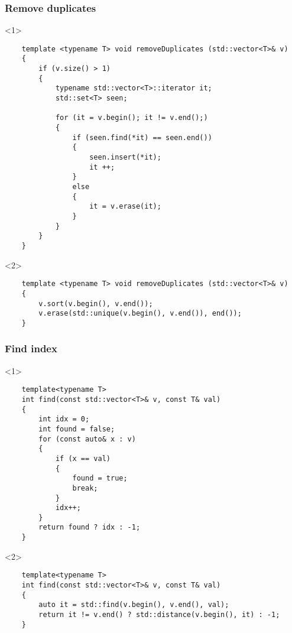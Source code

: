 \documentclass{beamer}
\begin{document}
\begin{frame}[fragile]
\frametitle{Remove duplicates}
    \begin{onlyenv}<1>
    \begin{lstlisting}
    template <typename T> void removeDuplicates (std::vector<T>& v)
    {
        if (v.size() > 1)
        {
            typename std::vector<T>::iterator it;
            std::set<T> seen;

            for (it = v.begin(); it != v.end();)
            {
                if (seen.find(*it) == seen.end())
                {
                    seen.insert(*it);
                    it ++;
                }
                else
                {
                    it = v.erase(it);
                }
            }
        }
    }
    \end{lstlisting}
    \end{onlyenv}
    \begin{onlyenv}<2>
    \begin{lstlisting}
    template <typename T> void removeDuplicates (std::vector<T>& v)
    {
        v.sort(v.begin(), v.end());
        v.erase(std::unique(v.begin(), v.end()), end());
    }
    \end{lstlisting}
    \end{onlyenv}
\end{frame}

\begin{frame}[fragile]
\frametitle{Find index}
    \begin{onlyenv}<1>
    \begin{lstlisting}
    template<typename T>
    int find(const std::vector<T>& v, const T& val)
    {
        int idx = 0;
        int found = false;
        for (const auto& x : v)
        {
            if (x == val)
            {
                found = true;
                break;
            }
            idx++;
        }
        return found ? idx : -1;
    }
    \end{lstlisting}
    \end{onlyenv}
    \begin{onlyenv}<2>
    \begin{lstlisting}
    template<typename T>
    int find(const std::vector<T>& v, const T& val)
    {
        auto it = std::find(v.begin(), v.end(), val);
        return it != v.end() ? std::distance(v.begin(), it) : -1;
    }
    \end{lstlisting}
    \end{onlyenv}
\end{frame}
\end{document}
